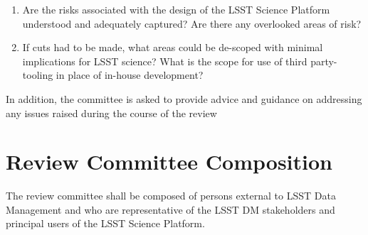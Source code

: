 \documentclass[DM,lsstdraft,STS,toc]{lsstdoc}
\begin{document}
\begin{enumerate}
%
\item Are the risks associated with the design of the LSST Science Platform understood and adequately captured? Are there any overlooked areas of risk?
%
\item If cuts had to be made, what areas could be de-scoped with minimal implications for LSST science? What is the scope for use of third party-tooling in place of in-house development? 
\color{red}{If DM-10 is invoked, or if the variant to freeze rather than eliminate the Portal is invoked, this question will be rephrased to reflect accordingly.}


\end{enumerate}

In addition, the committee is asked to provide advice and guidance on addressing any issues raised during the course of the review

\section{Review Committee Composition}
The review committee shall be composed of persons external to LSST Data Management
and who are representative of the LSST DM stakeholders and principal users of the LSST Science Platform.


\end{document}
